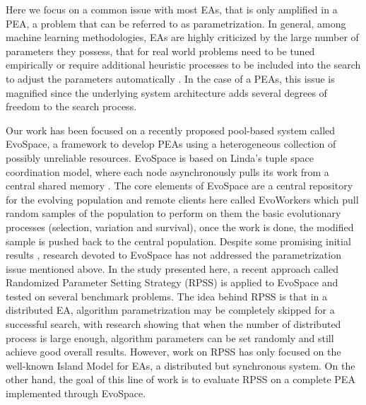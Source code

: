 \documentclass{llncs}
\begin{document}
Here we focus on a common issue with most EAs, that is only amplified in a PEA, a problem that can be referred to as parametrization.
In general, among machine learning methodologies, EAs are highly criticized by the large number of parameters they possess,
that for real world problems need to be tuned empirically or require additional heuristic processes to be included into the search to
adjust the parameters automatically \cite{ss}.
In the case of a PEAs, this issue is magnified since the underlying system architecture adds several degrees of freedom to the search process.

Our  work has been focused on a recently proposed pool-based system called EvoSpace, a framework to develop PEAs using 
a heterogeneous collection of possibly unreliable resources.
EvoSpace is based on Linda's tuple space coordination model, where each node asynchronously
pulls its work from a central shared memory  \cite{Evospace,Musart,FreeLunch,Fire}. The core elements of EvoSpace are a central 
repository for the evolving population and remote clients here called EvoWorkers
which pull random samples of the population to perform on them the basic evolutionary
processes (selection, variation and survival), once the work is done, the
modified sample is pushed back to the central population.
Despite some promising initial results \cite{Evospace,Musart,FreeLunch,Fire}, research devoted to EvoSpace has not addressed the parametrization issue mentioned above.
In the study presented here, a recent approach called Randomized Parameter Setting Strategy (RPSS) \cite{fuku1,fuku2} is applied to EvoSpace and tested on several
benchmark problems.
The idea behind RPSS is that in a distributed EA, algorithm parametrization may be completely skipped for a successful search,
with research showing that when the number of distributed process is large enough, algorithm parameters can be set randomly and still achieve
good overall results.
However, work on RPSS has only focused on the well-known Island Model for EAs, a distributed but synchronous system.
On the other hand, the goal of this line of work is to evaluate RPSS on a
complete PEA implemented through EvoSpace.
\end{document}

